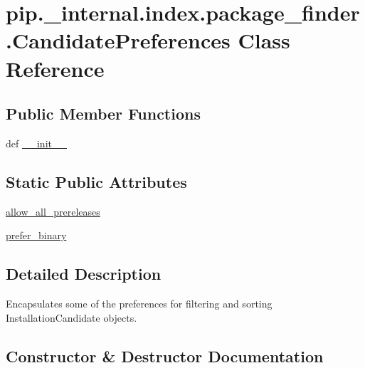 \hypertarget{classpip_1_1__internal_1_1index_1_1package__finder_1_1CandidatePreferences}{}\section{pip.\+\_\+internal.\+index.\+package\+\_\+finder.\+Candidate\+Preferences Class Reference}
\label{classpip_1_1__internal_1_1index_1_1package__finder_1_1CandidatePreferences}
\subsection*{Public Member Functions}
\begin{DoxyCompactItemize}
\item 
def \hyperlink{classpip_1_1__internal_1_1index_1_1package__finder_1_1CandidatePreferences_a6a8e40846740d77ab72d88e4d51e331a}{\+\_\+\+\_\+init\+\_\+\+\_\+}
\end{DoxyCompactItemize}
\subsection*{Static Public Attributes}
\begin{DoxyCompactItemize}
\item 
\hyperlink{classpip_1_1__internal_1_1index_1_1package__finder_1_1CandidatePreferences_a572cb7da3851d30d72e38ce172ace373}{allow\+\_\+all\+\_\+prereleases}
\item 
\hyperlink{classpip_1_1__internal_1_1index_1_1package__finder_1_1CandidatePreferences_a386ac1b85347b135b5e6d338aa82116a}{prefer\+\_\+binary}
\end{DoxyCompactItemize}


\subsection{Detailed Description}
\begin{DoxyVerb}Encapsulates some of the preferences for filtering and sorting
InstallationCandidate objects.
\end{DoxyVerb}
 

\subsection{Constructor \& Destructor Documentation}
\mbox{\label{classpip_1_1__internal_1_1index_1_1package__finder_1_1CandidatePreferences_a6a8e40846740d77ab72d88e4d51e331a}} 
